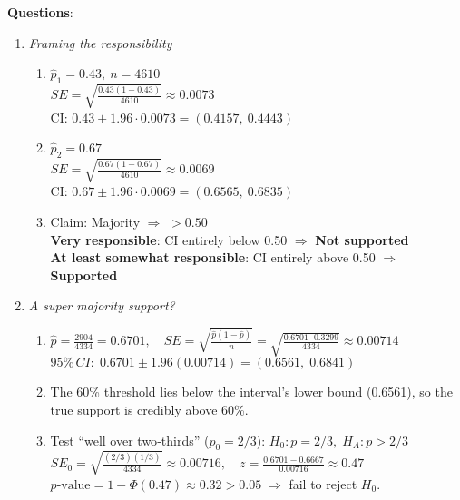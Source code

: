 \documentclass{article}
\begin{document}
\textbf{Questions}:
\begin{enumerate}  %
\item \emph{Framing the responsibility}
\begin{enumerate}[label=(\alph*)]
    \item 
    $\hat{p}_1 = 0.43,\ n = 4610$ \\
    $SE = \sqrt{\frac{0.43(1 - 0.43)}{4610}} \approx 0.0073$ \\
    CI: $0.43 \pm 1.96 \cdot 0.0073 = (0.4157,\ 0.4443)$

    \item 
    $\hat{p}_2 = 0.67$ \\
    $SE = \sqrt{\frac{0.67(1 - 0.67)}{4610}} \approx 0.0069$ \\
    CI: $0.67 \pm 1.96 \cdot 0.0069 = (0.6565,\ 0.6835)$

    \item 
    Claim: Majority $\Rightarrow$ $> 0.50$ \\
    \textbf{Very responsible}: CI entirely below 0.50 $\Rightarrow$ \textbf{Not supported} \\
    \textbf{At least somewhat responsible}: CI entirely above 0.50 $\Rightarrow$ \textbf{Supported}
\end{enumerate}

\item \emph{A super majority support?}
\begin{enumerate}[label=(\alph*)]
  \item $\displaystyle \hat p = \frac{2904}{4334}=0.6701,\quad SE=\sqrt{\frac{\hat p(1-\hat p)}{n}}=\sqrt{\frac{0.6701\cdot0.3299}{4334}}\approx0.00714$\\
        $95\%\,CI:\;0.6701\pm1.96(0.00714)=(0.6561,\;0.6841)$
  \item The 60\% threshold lies below the interval’s lower bound (0.6561), so the true support is credibly above 60\%.
  \item Test “well over two‐thirds” ($p_0=2/3$):  
        $H_0:p=2/3,\;H_A:p>2/3$\\
        $SE_0=\sqrt{\frac{(2/3)(1/3)}{4334}}\approx0.00716,\quad 
         z=\frac{0.6701-0.6667}{0.00716}\approx0.47$\\
        $p\text{-value}=1-\Phi(0.47)\approx0.32>0.05\;\Rightarrow$ fail to reject $H_0$.
\end{enumerate}


\end{enumerate}
\end{document}
